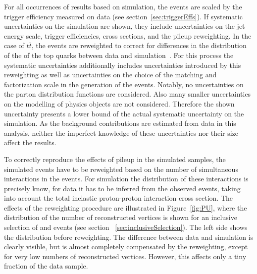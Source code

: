 For all occurrences of results based on simulation, the events are scaled by the trigger efficiency measured on data (see section~\ref{sec:triggerEffs}). If systematic uncertainties on the simulation are shown, they include uncertainties on the jet energy scale, trigger efficiencies, cross sections, and the pileup reweighting. In the case of $t\bar{t}$, the events are reweighted to correct for differences in the distribution of the \pt of the top quarks between data and simulation~\cite{TopReweighting}. For this process the systematic uncertainties additionally includes uncertainties introduced by this reweighting as well as uncertainties on the choice of the matching and factorization scale in the generation of the events. Notably, no uncertainties on the parton distribution functions are considered. Also many smaller uncertainties on the modelling of physics objects are not considered. Therefore the shown uncertainty presents a lower bound of the actual systematic uncertainty on the simulation. As the background contributions are estimated from data in this analysis, neither the imperfect knowledge of these uncertainties nor their size affect the results.

To correctly reproduce the effects of pileup in the simulated samples, the simulated events have to be reweighted based on the number of simultaneous interactions in the events. For simulation the distribution of these interactions is precisely know, for data it has to be inferred from the observed events, taking into account the total inelastic proton-proton interaction cross section. The effects of the reweighting procedure are illustrated in Figure~\ref{fig:PU}, where the distribution of the number of reconstructed vertices is shown for an inclusive selection of \EE and \MM events (see section ~\ref{sec:inclusiveSelection}). The left side shows the distribution before reweighting. The difference between data and simulation is clearly visible, but is almost completely compensated by the reweighting, except for very low numbers of reconstructed vertices. However, this affects only a tiny fraction of the data sample.

